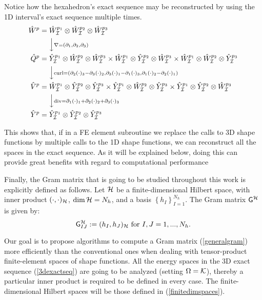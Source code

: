Notice how the hexahedron's exact sequence may be reconstructed by using the 1D interval's exact sequence multiple times.
% 
\begin{align*}
    \hat{W}^p &= \hat{W}^{p_1}_{\mcI}\otimes\hat{W}^{p_2}_{\mcI}\otimes\hat{W}^{p_3}_{\mcI}\\
    \ &\ \ \ \ \Big\downarrow  \scriptstyle{\nabla=(\partial_1,\partial_2,\partial_3)}\\
    \hat{Q}^p &=      \hat{Y}^{p_1}_{\mcI}\otimes\hat{W}^{p_2}_{\mcI}\otimes\hat{W}^{p_3}_{\mcI}
                \times\hat{W}^{p_1}_{\mcI}\otimes\hat{Y}^{p_2}_{\mcI}\otimes\hat{W}^{p_3}_{\mcI}
                \times\hat{W}^{p_1}_{\mcI}\otimes\hat{W}^{p_2}_{\mcI}\otimes\hat{Y}^{p_3}_{\mcI}\\
    \ &\ \ \ \ \Big\downarrow  \scriptstyle{\curl=(\partial_2(\cdot)_3-\partial_3(\cdot)_2,\partial_3(\cdot)_1-\partial_1(\cdot)_3,\partial_1(\cdot)_2-\partial_2(\cdot)_1)} \\
    \hat{V}^p &=      \hat{W}^{p_1}_{\mcI}\otimes\hat{Y}^{p_2}_{\mcI}\otimes\hat{Y}^{p_3}_{\mcI}
                \times\hat{Y}^{p_1}_{\mcI}\otimes\hat{W}^{p_2}_{\mcI}\otimes\hat{Y}^{p_3}_{\mcI}
                \times\hat{Y}^{p_1}_{\mcI}\otimes\hat{Y}^{p_2}_{\mcI}\otimes\hat{W}^{p_3}_{\mcI}\\
    \ &\ \ \ \ \Big\downarrow \scriptstyle{\div=\partial_1(\cdot)_1+\partial_2(\cdot)_2+\partial_3(\cdot)_3} \\
    \hat{Y}^p&=\hat{Y}^{p_1}_{\mcI}\otimes\hat{Y}^{p_2}_{\mcI}\otimes\hat{Y}^{p_3}_{\mcI}
\end{align*}

This shows that, if in a FE element subroutine we replace the calls to 3D shape functions by multiple calls to the 1D shape functions, we can reconstruct all the spaces in the exact sequence. As it will be explained below, doing this can provide great benefits with regard to computational performance

Finally, the Gram matrix that is going to be studied throughout this work is explicitly defined as follows. Let $\mathcal{H}$ be a finite-dimensional Hilbert space, with inner product $(\cdot,\cdot)_{\mathcal{H}}$, $\operatorname*{dim}\mathcal{H}=N_h$, and a basis $\left\{h_I\right\}_{I=1}^{N_h}$. The Gram matrix $\mathsf{G}^{\mathcal{H}}$ is given by:
% 
\begin{equation}
    \mathsf{G}^{\mathcal{H}}_{IJ}:=(h_I,h_J)_{\mathcal{H}}\text{  for }I,J=1,...,N_h.
    \label{generalgram}
\end{equation}

Our goal is to propose algorithms to compute a Gram matrix (\ref{generalgram}) more efficiently than the conventional ones when dealing with tensor-product finite-element spaces of shape functions. All the energy spaces in the 3D exact sequence (\ref{3dexactseq}) are going to be analyzed (setting $\Omega=\mathcal{K}$), thereby a particular inner product is required to be defined in every case. The finite-dimensional Hilbert spaces will be those defined in (\ref{finitedimspaces}).

